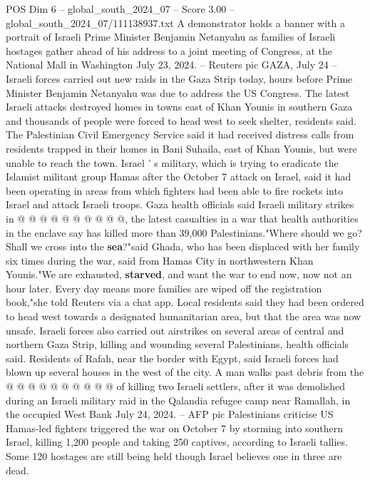 \begin{textsample}{POS Dim 6 – global\_south\_2024\_07 – Score 3.00 – global\_south\_2024\_07/111138937.txt}  \label{ex:f6_pos_339}
A demonstrator holds a banner with a portrait of Israeli Prime Minister Benjamin Netanyahu as families of Israeli hostages gather ahead of his address to a joint meeting of Congress, at the National Mall in Washington July 23, 2024. -- Reuters pic GAZA, July 24 -- Israeli forces carried out new raids in the Gaza Strip today, hours before Prime Minister Benjamin Netanyahu was due to address the US Congress.
The latest Israeli attacks destroyed homes in towns east of Khan Younis in southern Gaza and thousands of people were forced to head west to seek shelter, residents said.
The Palestinian Civil Emergency Service said it had received distress calls from residents trapped in their homes in Bani Suhaila, east of Khan Younis, but were unable to reach the town.
Israel ' s military, which is trying to eradicate the Islamist militant group Hamas after the October 7 attack on Israel, said it had been operating in areas from which fighters had been able to fire rockets into Israel and attack Israeli troops.
Gaza health officials said Israeli military strikes in @ @ @ @ @ @ @ @ @ @, the latest casualties in a war that health authorities in the enclave say has killed more than 39,000 Palestinians."Where should we go?
Shall we cross into the \textbf{sea}?"said Ghada, who has been displaced with her family six times during the war, said from Hamas City in northwestern Khan Younis."We are exhausted, \textbf{starved}, and want the war to end now, now not an hour later.
Every day means more families are wiped off the registration book,"she told Reuters via a chat app.
Local residents said they had been ordered to head west towards a designated humanitarian area, but that the area was now unsafe.
Israeli forces also carried out airstrikes on several areas of central and northern Gaza Strip, killing and wounding several Palestinians, health officials said.
Residents of Rafah, near the border with Egypt, said Israeli forces had blown up several houses in the west of the city.
A man walks past debris from the @ @ @ @ @ @ @ @ @ @ of killing two Israeli settlers, after it was demolished during an Israeli military raid in the Qalandia refugee camp near Ramallah, in the occupied West Bank July 24, 2024. -- AFP pic Palestinians criticise US Hamas-led fighters triggered the war on October 7 by storming into southern Israel, killing 1,200 people and taking 250 captives, according to Israeli tallies.
Some 120 hostages are still being held though Israel believes one in three are dead.

\end{textsample}
